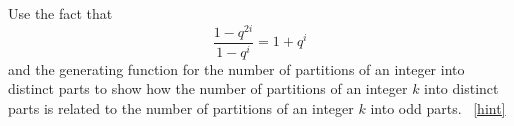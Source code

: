 \documentclass{book}
\begin{document}
\setcounter{project}{324}
\addtocounter{project}{-1}
\begin{activity}[]\label{activity-317}
\hypertarget{p-1656}{}%
Use the fact that%
\begin{equation*}
\frac{1-q^{2i}}{1-q^i}= 1+q^i
\end{equation*}
and the generating function for the number of partitions of an integer into distinct parts to show how the number of partitions of an integer \(k\) into distinct parts is related to the number of partitions of an integer \(k\) into odd parts.%
~\hfill{\tiny\hyperlink{a-324}{[hint]}\hypertarget{q-324}{}}\end{activity}
\end{document}
